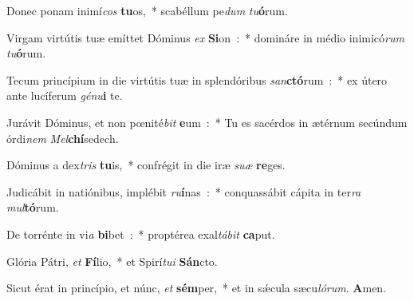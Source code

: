 ﻿\item Donec ponam inimí\emph{cos} \textbf{tu}os,~* scabéllum pe\emph{dum} \emph{tu}\textbf{ó}rum.
\item Virgam virtútis tuæ emíttet Dóminus \emph{ex} \textbf{Si}\-on~:~* domináre in médio inimicó\emph{rum} \emph{tu}\textbf{ó}rum.
\item Tecum princípium in die virtútis tuæ in splendóribus \emph{san}\-\textbf{ctó}\-rum~:~* ex útero ante lucíferum \emph{gé}\-\emph{nu}\-\textbf{i} te.
\item Jurávit Dóminus, et non pœnité\emph{bit} \textbf{e}\-um~:~* Tu es sacérdos in ætérnum secúndum órdi\emph{nem} \emph{Mel}\textbf{chí}sedech.
\item Dóminus a dex\emph{tris} \textbf{tu}\-is,~* confrégit in die iræ \emph{su}\-\emph{æ} \textbf{re}ges.
\item Judicábit in natiónibus, implébit \emph{ru}\-\textbf{í}\-nas~:~* conquassábit cápita in ter\emph{ra} \emph{mul}\textbf{tó}rum.
\item De torrénte in vi\emph{a} \textbf{bi}\-bet~:~* proptérea exal\emph{tá}\-\emph{bit} \textbf{ca}put.
\item Glória Pátri, \emph{et} \textbf{Fí}\-lio,~* et Spirí\emph{tu}\-\emph{i} \textbf{Sán}cto.
\item Sicut érat in princípio, et núnc, \emph{et} \textbf{sém}\-per,~* et in sǽcula sæcu\emph{ló}\-\emph{rum}. \textbf{A}men.
